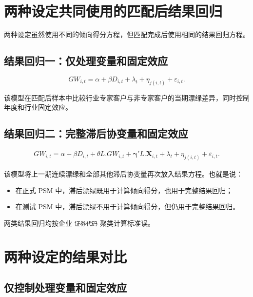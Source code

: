 \documentclass[12pt,a4paper]{article}
\begin{document}
\section{两种设定共同使用的匹配后结果回归}

两种设定虽然使用不同的倾向得分方程，但匹配完成后使用相同的结果回归方程。

\subsection{结果回归一：仅处理变量和固定效应}

\begin{equation}
    GW_{i,t}=\alpha+\beta D_{i,t}+\lambda_t+\eta_{j(i,t)}+\varepsilon_{i,t}.
\end{equation}

该模型在匹配后样本中比较行业专家客户与非专家客户的当期漂绿差异，同时控制年度和行业固定效应。

\subsection{结果回归二：完整滞后协变量和固定效应}

\begin{equation}
\begin{aligned}
    GW_{i,t}=\alpha+\beta D_{i,t}
    +\theta L.GW_{i,t}
    +\boldsymbol{\gamma}'L.\mathbf{X}_{i,t}
    +\lambda_t+\eta_{j(i,t)}+\varepsilon_{i,t}.
\end{aligned}
\end{equation}

该模型将上一期连续漂绿和全部其他滞后协变量再次放入结果方程。也就是说：

\begin{itemize}
    \item 在正式 PSM 中，滞后漂绿既用于计算倾向得分，也用于完整结果回归；
    \item 在测试 PSM 中，滞后漂绿不用于计算倾向得分，但仍用于完整结果回归。
\end{itemize}

两类结果回归均按企业 \texttt{证券代码} 聚类计算标准误。

\section{两种设定的结果对比}

\subsection{仅控制处理变量和固定效应}
\end{document}
